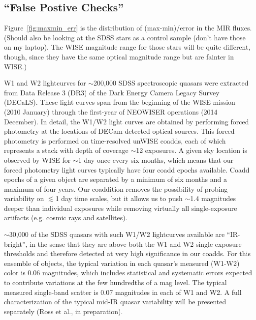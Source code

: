 \documentclass{emulateapj}
\begin{document}
\subsection{``False Postive Checks''}
Figure~\ref{fig:maxmin_err} is the distribution of (max-min)/error in
the MIR fluxes.  (Should also be looking at the SDSS stars as a
control sample (don’t have those on my laptop).  The WISE magnitude
range for those stars will be quite different, though, since they have
the same optical magnitude range but are fainter in WISE.)



W1 and W2 lightcurves for $\sim$200,000 SDSS spectroscopic quasars
were extracted from Data Release 3 (DR3) of the Dark Energy Camera
Legacy Survey (DECaLS). These light curves span from the beginning of
the WISE mission (2010 January) through the first-year of NEOWISER
operations (2014 December). In detail, the W1/W2 light curves are
obtained by performing forced photometry at the locations of
DECam-detected optical sources. This forced photometry is performed on
time-resolved unWISE coadds, each of which represents a stack with
depth of coverage $\sim$12 exposures. A given sky location is observed
by WISE for $\sim$1 day once every six months, which means that our
forced photometry light curves typically have four coadd epochs
available. Coadd epochs of a given object are separated by a minimum
of six months and a maximum of four years. Our coaddition removes the
possibility of probing variability on $\lesssim$1 day time scales, but
it allows us to push $\sim$1.4 magnitudes deeper than individual
exposures while removing virtually all single-exposure artifacts
(e.g. cosmic rays and satellites).

$\sim$30,000 of the SDSS quasars with such W1/W2 lightcurves available
are ``IR-bright'', in the sense that they are above both the W1 and W2
single exposure thresholds and therefore detected at very high
significance in our coadds. For this ensemble of objects, the typical
variation in each quasar's measured (W1-W2) color is 0.06 magnitudes,
which includes statistical and systematic errors expected to
contribute variations at the few hundredths of a mag level. The
typical measured single-band scatter is 0.07 magnitudes in each of W1
and W2. A full characterization of the typical mid-IR quasar
variability will be presented separately (Ross et al., in
preparation).
\end{document}

